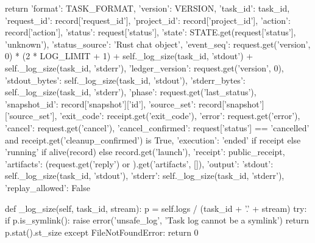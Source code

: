         return {'format': TASK_FORMAT, 'version': VERSION, 'task_id': task_id,
                'request_id': record['request_id'], 'project_id': record['project_id'], 'action': record['action'],
                'status': request['status'], 'state': STATE.get(request['status'], 'unknown'),
                'status_source': 'Rust chat object',
                'event_seq': request.get('version', 0) * (2 * LOG_LIMIT + 1) + self._log_size(task_id, 'stdout') + self._log_size(task_id, 'stderr'),
                'ledger_version': request.get('version', 0),
                'stdout_bytes': self._log_size(task_id, 'stdout'), 'stderr_bytes': self._log_size(task_id, 'stderr'),
                'phase': request.get('last_status'), 'snapshot_id': record['snapshot']['id'],
                'source_set': record['snapshot']['source_set'], 'exit_code': receipt.get('exit_code'),
                'error': request.get('error'), 'cancel': request.get('cancel'),
                'cancel_confirmed': request['status'] == 'cancelled' and receipt.get('cleanup_confirmed') is True,
                'execution': 'ended' if receipt else 'running' if alive(record) else record.get('launch'),
                'receipt': public_receipt, 'artifacts': (request.get('reply') or {}).get('artifacts', []),
                'output': {'stdout': self._log_size(task_id, 'stdout'), 'stderr': self._log_size(task_id, 'stderr')},
                'replay_allowed': False}

    def _log_size(self, task_id, stream):
        p = self.logs / (task_id + '.' + stream)
        try:
            if p.is_symlink():
                raise error('unsafe_log', 'Task log cannot be a symlink')
            return p.stat().st_size
        except FileNotFoundError:
            return 0

